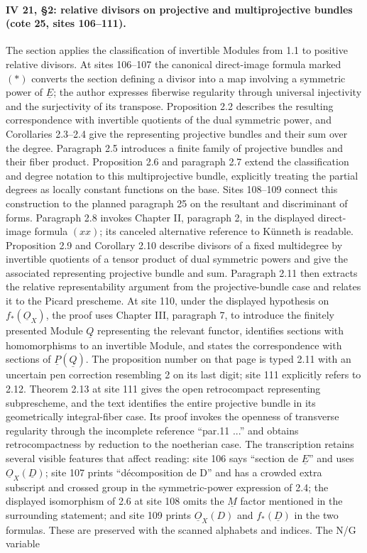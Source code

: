 \documentclass[10pt,a4paper]{article}
\begin{document}
\par{}
\paragraph{IV 21, \S 2: relative divisors on projective and multiprojective bundles (cote 25, sites 106--111).}
The section applies the classification of invertible Modules from 1.1 to positive relative divisors. At sites 106--107 the canonical direct-image formula marked $(*)$ converts the section defining a divisor into a map involving a symmetric power of $\underline E$; the author expresses fiberwise regularity through universal injectivity and the surjectivity of its transpose. Proposition 2.2 describes the resulting correspondence with invertible quotients of the dual symmetric power, and Corollaries 2.3--2.4 give the representing projective bundles and their sum over the degree. Paragraph 2.5 introduces a finite family of projective bundles and their fiber product. Proposition 2.6 and paragraph 2.7 extend the classification and degree notation to this multiprojective bundle, explicitly treating the partial degrees as locally constant functions on the base. Sites 108--109 connect this construction to the planned paragraph 25 on the resultant and discriminant of forms. Paragraph 2.8 invokes Chapter II, paragraph 2, in the displayed direct-image formula $(xx)$; its canceled alternative reference to Künneth is readable. Proposition 2.9 and Corollary 2.10 describe divisors of a fixed multidegree by invertible quotients of a tensor product of dual symmetric powers and give the associated representing projective bundle and sum. Paragraph 2.11 then extracts the relative representability argument from the projective-bundle case and relates it to the Picard prescheme. At site 110, under the displayed hypothesis on $f_*(\underline O_X)$, the proof uses Chapter III, paragraph 7, to introduce the finitely presented Module $\underline Q$ representing the relevant functor, identifies sections with homomorphisms to an invertible Module, and states the correspondence with sections of $\underline P(\underline Q)$. The proposition number on that page is typed 2.11 with an uncertain pen correction resembling 2 on its last digit; site 111 explicitly refers to 2.12. Theorem 2.13 at site 111 gives the open retrocompact representing subprescheme, and the text identifies the entire projective bundle in its geometrically integral-fiber case. Its proof invokes the openness of transverse regularity through the incomplete reference ``par.11 ...'' and obtains retrocompactness by reduction to the noetherian case. The transcription retains several visible features that affect reading: site 106 says ``section de $\underline E$'' and uses $\underline O_X(\underline D)$; site 107 prints ``décomposition de D'' and has a crowded extra subscript and crossed group in the symmetric-power expression of 2.4; the displayed isomorphism of 2.6 at site 108 omits the $\underline M$ factor mentioned in the surrounding statement; and site 109 prints $\underline O_X(D)$ and $f_*(\underline D)$ in the two formulas. These are preserved with the scanned alphabets and indices. The N/G variable 
\end{document}
